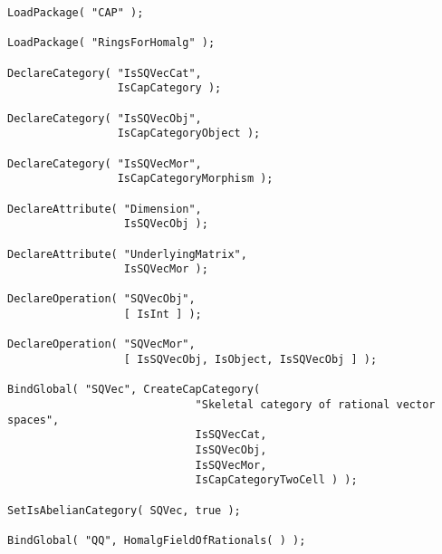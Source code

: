 \begin{small}
\begin{Verbatim}[frame=single]
LoadPackage( "CAP" );

LoadPackage( "RingsForHomalg" );

DeclareCategory( "IsSQVecCat",
                 IsCapCategory );

DeclareCategory( "IsSQVecObj",
                 IsCapCategoryObject );

DeclareCategory( "IsSQVecMor",
                 IsCapCategoryMorphism );

DeclareAttribute( "Dimension",
                  IsSQVecObj );

DeclareAttribute( "UnderlyingMatrix", 
                  IsSQVecMor );

DeclareOperation( "SQVecObj",
                  [ IsInt ] );

DeclareOperation( "SQVecMor",
                  [ IsSQVecObj, IsObject, IsSQVecObj ] );

BindGlobal( "SQVec", CreateCapCategory(
                             "Skeletal category of rational vector spaces",
                             IsSQVecCat,
                             IsSQVecObj,
                             IsSQVecMor,
                             IsCapCategoryTwoCell ) );

SetIsAbelianCategory( SQVec, true );

BindGlobal( "QQ", HomalgFieldOfRationals( ) );
\end{Verbatim}
\end{small}
